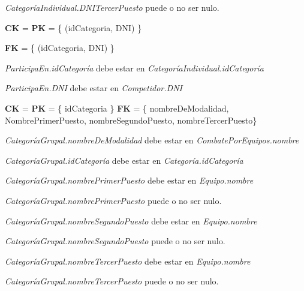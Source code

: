 \textit{CategoríaIndividual.DNITercerPuesto} puede o no ser nulo. \\


\textbf{CK} = \textbf{PK} = \{ (idCategoria, DNI) \}

\textbf{FK} = \{ (idCategoria, DNI) \}

\textit{ParticipaEn.idCategoría} debe estar en \textit{CategoríaIndividual.idCategoría}

\textit{ParticipaEn.DNI} debe estar en \textit{Competidor.DNI}\\


\textbf{CK} = \textbf{PK} = \{ idCategoria \}
\textbf{FK} = \{ nombreDeModalidad,  NombrePrimerPuesto, nombreSegundoPuesto, nombreTercerPuesto\}

\textit{CategoríaGrupal.nombreDeModalidad} debe estar en \textit{CombatePorEquipos.nombre}

\textit{CategoríaGrupal.idCategoría} debe estar en \textit{Categoría.idCategoría}

\textit{CategoríaGrupal.nombrePrimerPuesto} debe estar en \textit{Equipo.nombre}

\textit{CategoríaGrupal.nombrePrimerPuesto} puede o no ser nulo.

\textit{CategoríaGrupal.nombreSegundoPuesto} debe estar en \textit{Equipo.nombre}

\textit{CategoríaGrupal.nombreSegundoPuesto} puede o no ser nulo.

\textit{CategoríaGrupal.nombreTercerPuesto} debe estar en \textit{Equipo.nombre}

\textit{CategoríaGrupal.nombreTercerPuesto} puede o no ser nulo.\\
